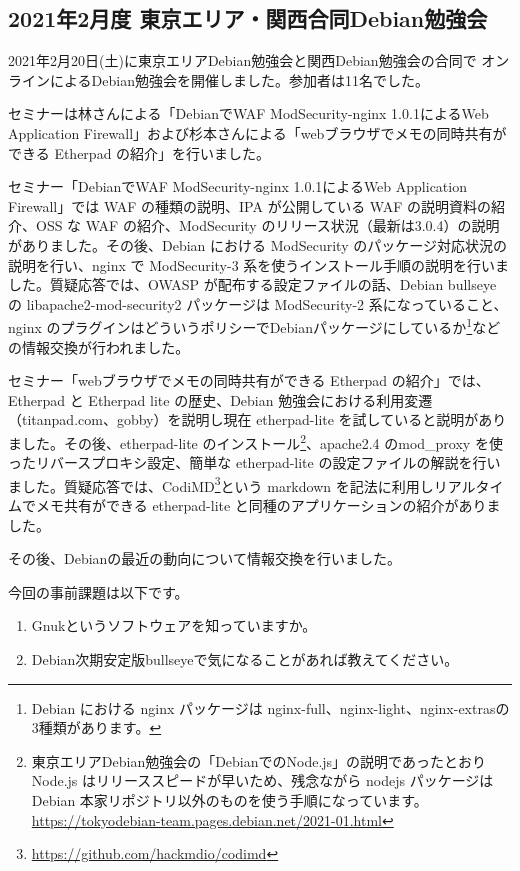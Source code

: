 \documentclass[mingoth,a4paper]{jsarticle}
\begin{document}

\subsection{2021年2月度 東京エリア・関西合同Debian勉強会}

2021年2月20日(土)に東京エリアDebian勉強会と関西Debian勉強会の合同で
オンラインによるDebian勉強会を開催しました。参加者は11名でした。

セミナーは林さんによる「DebianでWAF ModSecurity-nginx 1.0.1によるWeb Application Firewall」および杉本さんによる「webブラウザでメモの同時共有ができる Etherpad の紹介」を行いました。

セミナー「DebianでWAF ModSecurity-nginx 1.0.1によるWeb Application Firewall」では WAF の種類の説明、IPA が公開している WAF の説明資料の紹介、OSS な WAF の紹介、ModSecurity のリリース状況（最新は3.0.4）の説明がありました。その後、Debian における ModSecurity のパッケージ対応状況の説明を行い、nginx で ModSecurity-3 系を使うインストール手順の説明を行いました。質疑応答では、OWASP が配布する設定ファイルの話、Debian bullseye の libapache2-mod-security2 パッケージは ModSecurity-2 系になっていること、nginx のプラグインはどういうポリシーでDebianパッケージにしているか\footnote{Debian における nginx パッケージは nginx-full、nginx-light、nginx-extrasの3種類があります。}などの情報交換が行われました。

セミナー「webブラウザでメモの同時共有ができる Etherpad の紹介」では、Etherpad と Etherpad lite の歴史、Debian 勉強会における利用変遷（titanpad.com、gobby）を説明し現在 etherpad-lite を試していると説明がありました。その後、etherpad-lite のインストール\footnote{東京エリアDebian勉強会の「DebianでのNode.js」の説明であったとおり Node.js はリリーススピードが早いため、残念ながら nodejs パッケージは Debian 本家リポジトリ以外のものを使う手順になっています。 \url{https://tokyodebian-team.pages.debian.net/2021-01.html}}、apache2.4 のmod\_proxy を使ったリバースプロキシ設定、簡単な etherpad-lite の設定ファイルの解説を行いました。質疑応答では、CodiMD\footnote{\url{https://github.com/hackmdio/codimd}}という markdown を記法に利用しリアルタイムでメモ共有ができる etherpad-lite と同種のアプリケーションの紹介がありました。


その後、Debianの最近の動向について情報交換を行いました。


今回の事前課題は以下です。

\begin{enumerate}
\item Gnukというソフトウェアを知っていますか。
\item Debian次期安定版bullseyeで気になることがあれば教えてください。
\end{enumerate}
\end{document}
